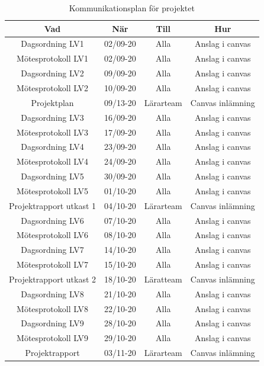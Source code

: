 \documentclass[a4paper]{article}
\begin{document}
\begin{table}[H]
    \centering
    \begin{tabular}{ |c|c|c|c| }\hline 
     Vad & När & Till & Hur \\\hline
     Dagsordning LV1 & 02/09-20 & Alla & Anslag i canvas \\\hline
     Mötesprotokoll LV1 & 02/09-20 & Alla & Anslag i canvas \\\hline
     Dagsordning LV2 & 09/09-20 & Alla & Anslag i canvas \\\hline
     Mötesprotokoll LV2 & 10/09-20 & Alla & Anslag i canvas \\\hline
     Projektplan & 09/13-20 & Lärarteam & Canvas inlämning \\\hline 
     Dagsordning LV3 & 16/09-20 & Alla & Anslag i canvas \\\hline
     Mötesprotokoll LV3 & 17/09-20 & Alla & Anslag i canvas \\\hline
     Dagsordning LV4 & 23/09-20 & Alla & Anslag i canvas \\\hline
     Mötesprotokoll LV4 & 24/09-20 & Alla & Anslag i canvas \\\hline
     Dagsordning LV5 & 30/09-20 & Alla & Anslag i canvas \\\hline
     Mötesprotokoll LV5 & 01/10-20 & Alla & Anslag i canvas \\\hline
     Projektrapport utkast 1 & 04/10-20 & Lärarteam & Canvas inlämning \\\hline
     Dagsordning LV6 & 07/10-20 & Alla & Anslag i canvas \\\hline
     Mötesprotokoll LV6 & 08/10-20 & Alla & Anslag i canvas \\\hline
     Dagsordning LV7 & 14/10-20 & Alla & Anslag i canvas \\\hline
     Mötesprotokoll LV7 & 15/10-20 & Alla & Anslag i canvas \\\hline
     Projektrapport utkast 2 & 18/10-20 & Läratteam & Canvas inlämning \\\hline
     Dagsordning LV8 & 21/10-20 & Alla & Anslag i canvas \\\hline
     Mötesprotokoll LV8 & 22/10-20 & Alla & Anslag i canvas \\\hline
     Dagsordning LV9 & 28/10-20 & Alla & Anslag i canvas \\\hline
     Mötesprotokoll LV9 & 29/10-20 & Alla & Anslag i canvas \\\hline
     Projektrapport & 03/11-20 & Lärarteam & Canvas inlämning \\\hline
    \end{tabular}
    \caption{Kommunikationsplan för projektet}
    \label{table:kommunikationsplan}
\end{table}
\end{document}
